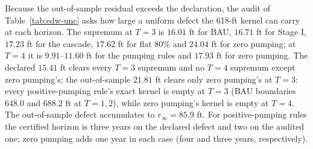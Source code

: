 \documentclass[11pt,a4paper]{article}
\theoremstyle{plain}
\theoremstyle{definition}
\theoremstyle{remark}
\begin{document}
Because the out-of-sample residual exceeds the declaration, the audit of Table~\ref{tab:edw-unc} asks how large a uniform defect the 618-ft kernel can carry at each horizon. The supremum at $T=3$ is $16.01$ ft for BAU, $16.71$ ft for Stage I, $17.23$ ft for the cascade, $17.62$ ft for flat 80\% and $24.04$ ft for zero pumping; at $T=4$ it is $9.91$--$11.60$ ft for the pumping rules and $17.93$ ft for zero pumping. The declared $15.41$ ft clears every $T=3$ supremum and no $T=4$ supremum except zero pumping's; the out-of-sample $21.81$ ft clears only zero pumping's at $T=3$: every positive-pumping rule's exact kernel is empty at $T=3$ (BAU boundaries $648.0$ and $688.2$ ft at $T=1,2$), while zero pumping's kernel is empty at $T=4$. The out-of-sample defect accumulates to $r_\infty=85.9$ ft. For positive-pumping rules the certified horizon is three years on the declared defect and two on the audited one; zero pumping adds one year in each case (four and three years, respectively).
\end{document}
